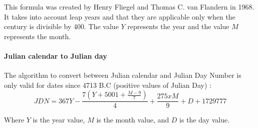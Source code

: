 This formula was created by Henry Fliegel and Thomas C. van Flandern in 1968. \cite{Fliegel:1968:LEM:364096.364097} It takes into account leap years and that they are applicable only when the century is divisible by 400. The value $Y$ represents the year and the value $M$ represents the month.
\paragraph{Julian calendar to Julian day}
The algorithm to convert between Julian calendar and Julian Day Number is only valid for dates since 4713 B.C (positive values of Julian Day) \cite{Dog}:\\
\begin{equation}
\label{eq:JDN_2_JD}
JDN=367Y-\frac{7 (Y + 5001 + \frac{M-9}{7})}{4}+\frac{275xM}{9}+D+1729777
\end{equation}

Where $Y$ is the year value, $M$ is the month value, and $D$ is the day value.

%

